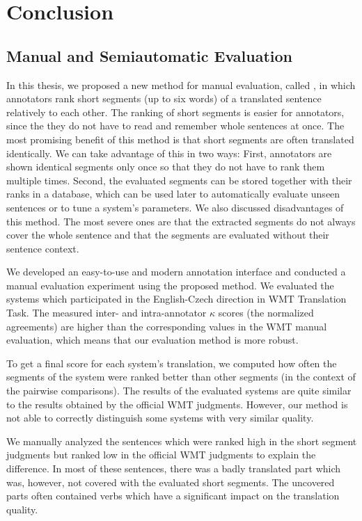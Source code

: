 \chapter{Conclusion}
\label{chapter:conclusion}

\section{Manual and Semiautomatic Evaluation}

In this thesis, we proposed a new method for manual evaluation, called
, in which annotators rank short segments (up to six words) of
a translated sentence relatively to each other. The ranking of short segments
is easier for annotators, since the they do not have to read and remember whole
sentences at once. The most promising benefit of this method is that short
segments are often translated identically.  We can take advantage of this in
two ways: First, annotators are shown identical segments only once so that they
do not have to rank them multiple times. Second, the evaluated segments can be
stored together with their ranks in a database, which can be used later to
automatically evaluate unseen sentences or to tune a system's parameters. We
also discussed disadvantages of this method. The most severe ones are that the
extracted segments do not always cover the whole sentence and that the segments
are evaluated without their sentence context.

We developed an easy-to-use and modern annotation interface and conducted a
manual evaluation experiment using the proposed method. We evaluated the
systems which participated in the English-Czech direction in WMT Translation
Task. The measured inter- and intra-annotator $\kappa$ scores (the
normalized agreements) are higher than the corresponding values in the WMT
manual evaluation, which means that our evaluation method is more robust.

To get a final score for each system's translation, we computed how often the
segments of the system were ranked better than other segments (in the context
of the pairwise comparisons). The results of the evaluated systems are quite
similar to the results obtained by the official WMT judgments. However, our
method is not able to correctly distinguish some systems with very similar
quality.
\begin{comment}
The Pearson correlation coefficient between the short segments scores
and the official human scores is 0.978, which is lower than correlations of
some of the best performing automatic metrics (\metric{NIST}, \metric{CDER},
\metric{ELEXR}).
\end{comment}
We manually analyzed the sentences which were ranked high in
the short segment judgments but ranked low in the official WMT judgments to
explain the difference. In most of these sentences, there was a badly
translated part which was, however, not covered with the evaluated short
segments.  The uncovered parts often contained verbs which have a significant
impact on the translation quality. 

